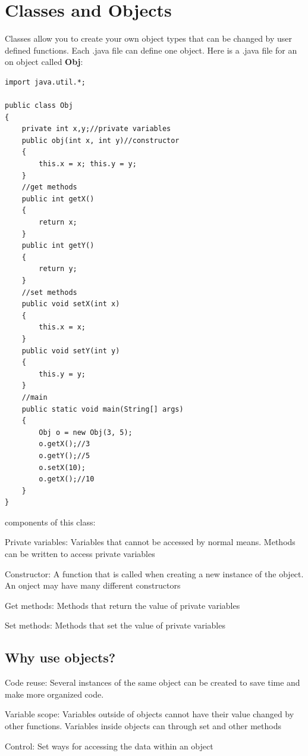 \documentclass{article}
\begin{document}
\section{Classes and Objects}

Classes allow you to create your own object types that can be changed by user defined functions. Each .java file can define one object. Here is a .java file for an on object called \textbf{Obj}:
\begin{lstlisting}
import java.util.*;

public class Obj
{
	private int x,y;//private variables
	public obj(int x, int y)//constructor
	{
		this.x = x; this.y = y;
	}
	//get methods
	public int getX()
	{
		return x;
	}
	public int getY()
	{
		return y;
	}
	//set methods
	public void setX(int x)
	{
		this.x = x;
	}
	public void setY(int y)
	{
		this.y = y;
	}
	//main
	public static void main(String[] args)
	{
		Obj o = new Obj(3, 5);
		o.getX();//3
		o.getY();//5
		o.setX(10);
		o.getX();//10
	}
}
\end{lstlisting}
components of this class:
\begin{steps}
	\item Private variables: Variables that cannot be accessed by normal means. Methods can be written to access private variables
	\item Constructor: A function that is called when creating a new instance of the object. An onject may have many different constructors
	\item Get methods: Methods that return the value of private variables
	\item Set methods: Methods that set the value of private variables
\end{steps}

\subsection{Why use objects?}
\begin{steps}
	\item Code reuse: Several instances of the same object can be created to save time and make more organized code.
	\item Variable scope: Variables outside of objects cannot have their value changed by other functions. Variables inside objects can through set and other methods
	\item Control: Set ways for accessing the data within an object
\end{steps}
\end{document}
